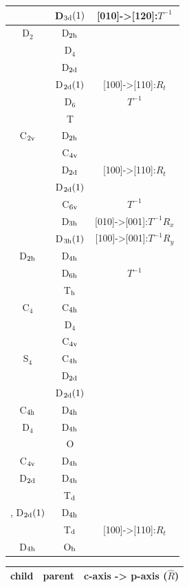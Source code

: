\documentclass[11pt]{easymemo}
\begin{document}
\begin{table}[t]
\begin{center}
\begin{tabular}{ccc}
   & D$_{\rm 3d}(1)$ & [010]->[120]:$T^{-1}$ \\ \hline\hline
D$_2$ & D$_{\rm 2h}$ & \\
   & D$_4$ & \\
   & D$_{\rm 2d}$ & \\
   & D$_{\rm 2d}(1)$ & [100]->[110]:$R_t$ \\
   & D$_6$ & $T^{-1}$ \\
   & T & \\ \hline
C$_{\rm 2v}$ & D$_{\rm 2h}$ & \\
    & C$_{\rm 4v}$ & \\
    & D$_{\rm 2d}$ & [100]->[110]:$R_t$ \\
    & D$_{\rm 2d}(1)$ & \\
    & C$_{\rm 6v}$ & $T^{-1}$ \\
    & D$_{\rm 3h}$ & [010]->[001]:$T^{-1}R_x$ \\
    & D$_{\rm 3h}(1)$ & [100]->[001]:$T^{-1}R_y$ \\ \hline
D$_{\rm 2h}$ & D$_{\rm 4h}$ & \\
    & D$_{\rm 6h}$ & $T^{-1}$ \\
    & T$_{\rm h}$ & \\ \hline\hline
C$_4$ & C$_{\rm 4h}$ & \\
   & D$_4$ & \\
   & C$_{\rm 4v}$ & \\ \hline
S$_4$ & C$_{\rm 4h}$ & \\
   & D$_{\rm 2d}$ & \\
   & D$_{\rm 2d}(1)$ & \\ \hline
C$_{\rm 4h}$ & D$_{\rm 4h}$ & \\ \hline
D$_4$ & D$_{\rm 4h}$ & \\
   & O & \\ \hline
C$_{\rm 4v}$ & D$_{\rm 4h}$ & \\ \hline
D$_{\rm 2d}$ & D$_{\rm 4h}$ & \\
    & T$_{\rm d}$ & \\ \hline,
D$_{\rm 2d}(1)$ & D$_{\rm 4h}$ & \\
      & T$_{\rm d}$ & [100]->[110]:$R_t$ \\ \hline
D$_{\rm 4h}$ & O$_{\rm h}$ & \\ \hline\hline
\end{tabular}
\hspace{1cm}
\begin{tabular}{ccc} \hline\hline
child & parent & c-axis -> p-axis ($\hat{R}$) \\ \hline

\end{tabular}
\end{center}
\end{table}
\end{document}
